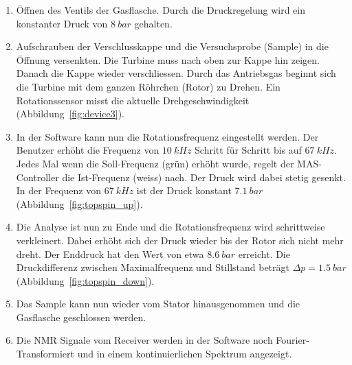 \documentclass[a4paper]{article}
\begin{document}
\begin{multicols*}{2}
				\begin{enumerate}[leftmargin=*, label=\arabic*.]
					\setlength{\itemsep}{0mm}
					\setlength{\parskip}{1mm}
					\setlength{\parindent}{0mm}
					\item Öffnen des Ventils der Gasflasche. Durch die Druckregelung wird ein konstanter Druck
					      von $\SI{8}{bar}$ gehalten.
					\item Aufschrauben der Verschlusskappe und die Versuchsprobe (Sample) in die Öffnung versenkten.
					      Die Turbine muss nach oben zur Kappe hin zeigen. Danach die Kappe wieder verschliessen.
					      Durch das Antriebsgas beginnt sich die Turbine mit dem ganzen Röhrchen (Rotor) zu Drehen.
					      Ein Rotationssensor misst die aktuelle Drehgeschwindigkeit (Abbildung~\ref{fig:device3}).
					\item In der Software kann nun die Rotationsfrequenz eingestellt werden. Der Benutzer erhöht
					      die Frequenz von $\SI{10}{kHz}$ Schritt für Schritt bis auf $\SI{67}{kHz}$. Jedes Mal
					      wenn die Soll-Frequenz (grün) erhöht wurde, regelt der MAS-Controller die Ist-Frequenz (weiss)
					      nach. Der Druck wird dabei stetig gesenkt. In der Frequenz von $\SI{67}{kHz}$ ist der Druck
					      konstant $\SI{7.1}{bar}$ (Abbildung~\ref{fig:topspin_up}).
					\item Die Analyse ist nun zu Ende und die Rotationsfrequenz wird schrittweise verkleinert. Dabei erhöht 
					      sich der Druck wieder bis der Rotor sich nicht mehr dreht. Der Enddruck hat den Wert von etwa
					      $\SI{8.6}{bar}$ erreicht. Die Druckdifferenz zwischen Maximalfrequenz und Stillstand beträgt
					      $ \Delta p = \SI{1.5}{bar}$ (Abbildung~\ref{fig:topspin_down}).
					\item Das Sample kann nun wieder vom Stator hinausgenommen und die Gasflasche geschlossen werden.
					\item Die NMR Signale vom Receiver werden in der Software noch Fourier-Transformiert und in einem
					      kontinuierlichen Spektrum angezeigt.
				\end{enumerate}
				

\end{multicols*}
\end{document}
